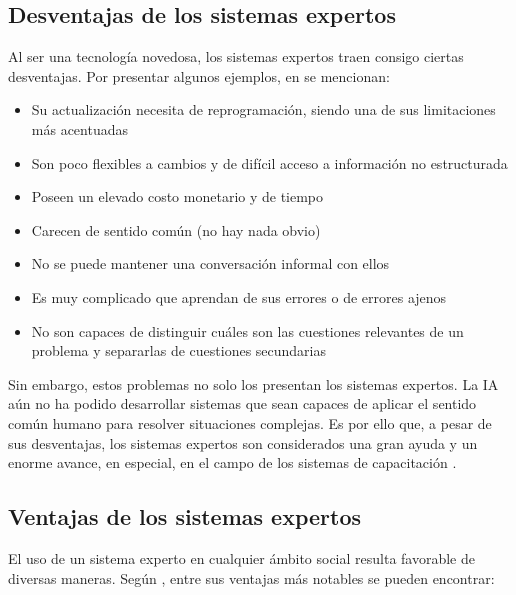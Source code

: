 \subsection{Desventajas de los sistemas expertos}
Al ser una tecnología novedosa, los sistemas expertos traen consigo ciertas desventajas. Por presentar algunos ejemplos, en \cite{Kandula2020} se mencionan:

\begin{itemize}
\item Su actualización necesita de reprogramación, siendo una de sus limitaciones más acentuadas
\item Son poco flexibles a cambios y de difícil acceso a información no estructurada
\item Poseen un elevado costo monetario y de tiempo
\item Carecen de sentido común (no hay nada obvio)
\item No se puede mantener una conversación informal con ellos
\item Es muy complicado que aprendan de sus errores o de errores ajenos
\item No son capaces de distinguir cuáles son las cuestiones relevantes de un
problema y separarlas de cuestiones secundarias
\end{itemize}

Sin embargo, estos problemas no solo los presentan los sistemas expertos. La IA aún no ha podido desarrollar sistemas que
sean capaces de aplicar el sentido común humano para resolver situaciones complejas. Es por ello que, a pesar de sus desventajas, los sistemas expertos son considerados una gran ayuda y un enorme avance, en especial, en el campo de los sistemas de capacitación \cite{Barham2022}.

\subsection{Ventajas de los sistemas expertos}
El uso de un sistema experto en cualquier ámbito social resulta favorable de diversas maneras. Según \cite{Mitchell1990}, entre sus ventajas más notables se pueden encontrar:

